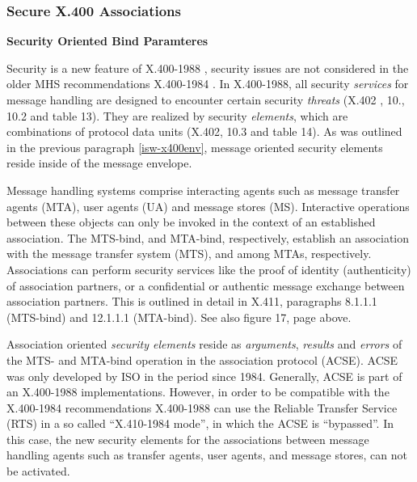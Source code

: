 \subsubsection{Secure X.400 Associations}
\label{isw-x400as}

{\bf Security Oriented Bind Paramteres}
\label{isw-sbp}

Security is a new feature of X.400-1988 \cite{cci2},
security issues are not considered in the older MHS recommendations
X.400-1984 \cite{cci1}.
In X.400-1988,
all security {\em services} for message handling
are designed to encounter certain security {\em threats}
(X.402 \cite{cci2}, 10., 10.2 and table 13).
They are realized by security {\em elements}, which are
combinations of protocol data units
(X.402, 10.3 and table 14).
As was outlined in the previous paragraph \ref{isw-x400env},
message oriented security elements reside
inside of the message envelope.

Message handling systems comprise interacting agents such as
message transfer agents (MTA), user agents (UA) and message stores (MS).
Interactive operations between these objects can only be invoked
in the context of an established association.
The MTS-bind, and MTA-bind, respectively,
establish an association with the message transfer system (MTS),
and among MTAs, respectively.
Associations can perform security services
like the proof of identity (authenticity) of association partners,
or a confidential or authentic message exchange between association partners.
This is outlined in detail in X.411, paragraphs 8.1.1.1 (MTS-bind)
and 12.1.1.1 (MTA-bind).
See also figure 17, page \pageref{fig-isw-mhs-1} above.

Association oriented {\em security elements} reside as
{\em arguments}, {\em results} and {\em errors}
of the MTS- and MTA-bind operation in the association protocol (ACSE).
ACSE was only developed by ISO in the period since 1984.
Generally, ACSE is part of an X.400-1988 implementations.
However,
in order to be compatible with the X.400-1984 recommendations
X.400-1988 can use the Reliable Transfer Service (RTS)
in a so called ``X.410-1984 mode'', in which the ACSE
is ``bypassed''. In this case, the new security elements
for the associations between message handling agents
such as transfer agents, user agents, and message stores,
can not be activated.

